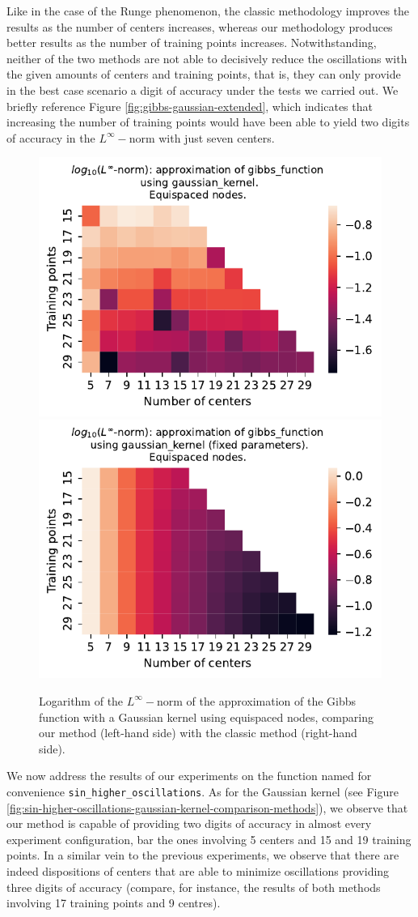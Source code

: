 \documentclass[12pt]{report} %
\begin{document}
Like
in the case of the Runge phenomenon, the classic methodology improves
the results as the number of centers increases, whereas our methodology
produces better results as the number of training points increases.
Notwithstanding, neither of the two methods are not able to decisively reduce the oscillations with the given amounts of centers and training points, that is, they can only provide in the best case scenario a digit of accuracy under the tests we carried out. We briefly reference Figure \ref{fig:gibbs-gaussian-extended}, which indicates that increasing the number of training points would have been able to yield two digits of accuracy in the $L^\infty-$norm with just seven centers.

\begin{figure}[ht]
    \centering
    
    \includegraphics[width=.49\textwidth]{imagenes/experiments/1d/variational/gibbs_function-Kgaussian_kernel-Equi.pdf}
    \includegraphics[width=.49\textwidth]{imagenes/experiments/1d/least_squares/opt-gibbs_function-Kgaussian_kernel-Equi.pdf}
    \caption{Logarithm of the $L^\infty-$norm of the approximation of the Gibbs function with a Gaussian kernel using equispaced nodes, comparing our method (left-hand side) with the classic method (right-hand side).}
    \label{fig:gibbs-gaussian-kernel-comparison-methods}
\end{figure}

We now address the results of our experiments on the function named for convenience \texttt{sin\_higher\_oscillations}. As for the Gaussian kernel (see Figure \ref{fig:sin-higher-oscillations-gaussian-kernel-comparison-methods}), we observe that our method is capable of providing two digits of accuracy in almost every experiment configuration, bar the ones involving 5 centers and 15 and 19 training points. In a similar vein to the previous experiments, we observe that there are indeed dispositions of centers that are able to minimize oscillations providing three digits of accuracy (compare, for instance, the results of both methods involving 17 training points and 9 centres).
\end{document}

